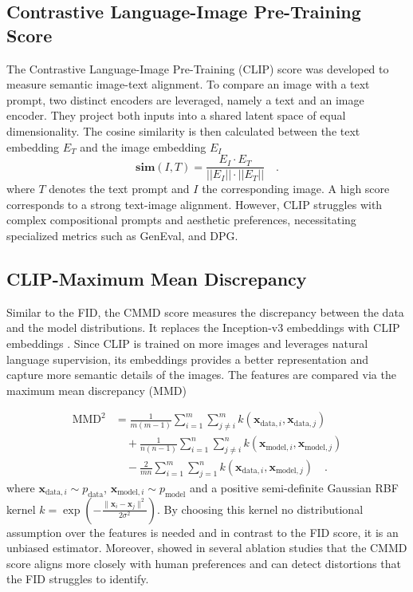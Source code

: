 \subsection{Contrastive Language-Image Pre-Training Score}
The Contrastive Language-Image Pre-Training (\gls{CLIP}) score \cite{CLIP} was developed to measure semantic image-text alignment. To compare an image with a text prompt, two distinct encoders are leveraged, namely a text and an image encoder. They project both inputs into a shared latent space of equal dimensionality. The cosine similarity is then calculated between the text embedding $E_T$ and the image embedding $E_I$
\begin{equation}
	\textbf{sim}(I,T) = \frac{E_I \cdot E_T}{||E_I|| \cdot ||E_T||} \quad.
\end{equation}
where $T$ denotes the text prompt and $I$ the corresponding image. A high score corresponds to a strong text-image alignment. However, \gls{CLIP} struggles with complex compositional prompts and aesthetic preferences, necessitating specialized metrics such as GenEval, and DPG.
\subsection{CLIP-Maximum Mean Discrepancy}
Similar to the \gls{FID}, the \gls{CMMD} \cite{cmmd} score measures the discrepancy between the data and the model distributions. It replaces the Inception-v3 embeddings with \gls{CLIP} embeddings \cite{CLIP}. Since \gls{CLIP} is trained on more images and leverages natural language supervision, its embeddings provides a better representation and capture more semantic details of the images. The features are compared via the maximum mean discrepancy (\gls{MMD}) \cite{MMD1, MMD2}

\begin{equation}
	\begin{split}
		\text{MMD}^2 &= \frac{1}{m(m-1)} \sum_{i=1}^{m} \sum_{j \neq i}^{m} k(\mathbf{x}_{\text{data}, i}, \mathbf{x}_{\text{data}, j}) \\
		&\quad + \frac{1}{n(n-1)} \sum_{i=1}^{n} \sum_{j \neq i}^{n} k(\mathbf{x}_{\text{model}, i}, \mathbf{x}_{\text{model}, j}) \\
		&\quad - \frac{2}{mn} \sum_{i=1}^{m} \sum_{j=1}^{n} k(\mathbf{x}_{\text{data}, i}, \mathbf{x}_{\text{model}, j}) \quad.
	\end{split}
\end{equation}
where $\mathbf{x}_{\text{data}, i} \sim p_{\text{data}}$, $\mathbf{x}_{\text{model}, i} \sim p_{\text{model}}$ and a positive semi-definite Gaussian RBF kernel $k=\exp(- \frac{\| \mathbf{x}_i - \mathbf{x}_j \|^2}{ 2 \sigma^2})$. By choosing this kernel no distributional assumption over the features is needed and in contrast to the \gls{FID} score, it is an unbiased estimator. Moreover, \cite{cmmd} showed in several ablation studies that the \gls{CMMD} score aligns more closely with human preferences and can detect distortions that the \gls{FID} struggles to identify.   

